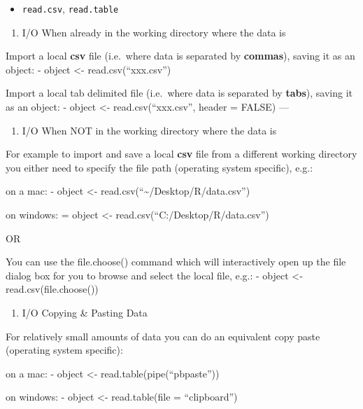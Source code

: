 \documentclass[]{book}
\providecommand{\tightlist}{%
  \setlength{\itemsep}{0pt}\setlength{\parskip}{0pt}}
\begin{document}
\begin{itemize}
\tightlist
\item
  \texttt{read.csv}, \texttt{read.table}
\end{itemize}

\begin{enumerate}
\def\labelenumi{(\alph{enumi})}
\tightlist
\item
  I/O When already in the working directory where the data is
\end{enumerate}

Import a local \textbf{csv} file (i.e.~where data is separated by \textbf{commas}), saving it as an object:
- object \textless{}- read.csv(``xxx.csv'')

Import a local tab delimited file (i.e.~where data is separated by \textbf{tabs}), saving it as an object:
- object \textless{}- read.csv(``xxx.csv'', header = FALSE)
---

\begin{enumerate}
\def\labelenumi{(\alph{enumi})}
\setcounter{enumi}{1}
\tightlist
\item
  I/O When NOT in the working directory where the data is
\end{enumerate}

For example to import and save a local \textbf{csv} file from a different working directory you either need to specify the file path (operating system specific), e.g.:

on a mac:
- object \textless{}- read.csv(``\textasciitilde{}/Desktop/R/data.csv'')

on windows:
= object \textless{}- read.csv(``C:/Desktop/R/data.csv'')

OR

You can use the file.choose() command which will interactively open up the file dialog box for you to browse and select the local file, e.g.:
- object \textless{}- read.csv(file.choose())

\begin{enumerate}
\def\labelenumi{(\alph{enumi})}
\setcounter{enumi}{2}
\tightlist
\item
  I/O Copying \& Pasting Data
\end{enumerate}

For relatively small amounts of data you can do an equivalent copy paste (operating system specific):

on a mac:
- object \textless{}- read.table(pipe(``pbpaste''))

on windows:
- object \textless{}- read.table(file = ``clipboard'')
\end{document}
